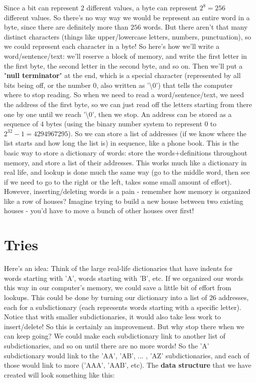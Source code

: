 \documentclass[12pt]{article}
\begin{document}
Since a bit can represent $2$ different values, a byte can represent $2^8 = 256$ different values. So there's no way way we would be represent an entire word in a byte, since there are definitely more than $256$ words. But there aren't that many distinct characters (things like upper/lowercase letters, numbers, punctuation), so we could represent each character in a byte! So here's how we'll write a word/sentence/text: we'll reserve a block of memory, and write the first letter in the first byte, the second letter in the second byte, and so on. Then we'll put a "\textbf{null terminator}" at the end, which is a special character (represented by all bits being off, or the number $0$, also written as '\textbackslash 0') that tells the computer where to stop reading. So when we need to read a word/sentence/text, we need the address of the first byte, so we can just read off the letters starting from there one by one until we reach '\textbackslash 0', then we stop. An address can be stored as a sequence of $4$ bytes (using the binary number system to represent $0$ to $2^{32} - 1 = 4294967295$). So we can store a list of addresses (if we know where the list starts and how long the list is) in sequence, like a phone book. This is the basic way to store a dictionary of words: store the words+definitions throughout memory, and store a list of their addresses. This works much like a dictionary in real life, and lookup is done much the same way (go to the middle word, then see if we need to go to the right or the left, takes some small amount of effort). However, inserting/deleting words is a pain - remember how memory is organized like a row of houses? Imagine trying to build a new house between two existing houses - you'd have to move a bunch of other houses over first!

\section{Tries}
Here's an idea: Think of the large real-life dictionaries that have indents for words starting with 'A', words starting with 'B', etc. If we organized our words this way in our computer's memory, we could save a little bit of effort from lookups. This could be done by turning our dictionary into a list of $26$ addresses, each for a subdictionary (each represents words starting with a specific letter). Notice that with smaller subdictionaries, it would also take less work to insert/delete! So this is certainly an improvement. But why stop there when we can keep going? We could make each subdictionary link to another list of subdictionaries, and so on until there are no more words! So the 'A' subdictionary would link to the 'AA', 'AB', ... , 'AZ' subdictionaries, and each of those would link to more ('AAA', 'AAB', etc). The \textbf{data structure} that we have created will look something like this: \\
\end{document}
